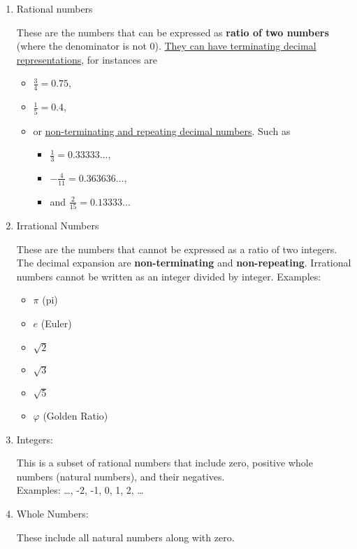 \documentclass{article}
\begin{document}
\begin{enumerate}

    \item Rational numbers \par 
    These are the numbers that can be expressed as
    \textbf{ratio of two numbers} (where the denominator is not 0).
    \underline{They can have terminating decimal representations},
    for instances are
    \begin{itemize}
        \item $\frac{3}{4} = 0.75$,
        \item $\frac{1}{5} = 0.4$,
        \item or \underline{non-terminating and repeating decimal numbers}.
        Such as
        \begin{itemize}
            \item $\frac{1}{3} = 0.33333\dots$,
            \item $- \frac{4}{11} = 0.363636\dots$,
            \item and $\frac{2}{15} = 0.13333\dots$
        \end{itemize}
    \end{itemize}

    \item Irrational Numbers \par
    These are the numbers that cannot be expressed as a ratio of two integers.
    The decimal expansion are \textbf{non-terminating} and \textbf{non-repeating}.
    Irrational numbers cannot be written as an integer divided by integer.
    Examples:
    \begin{itemize}
        \item $\pi$ (pi)
        \item $e$ (Euler)
        \item $\sqrt{2}$
        \item $\sqrt{3}$
        \item $\sqrt{5}$
        \item $\varphi$ (Golden Ratio)
    \end{itemize}

    \item Integers: \par
    This is a subset of rational numbers that include zero,
    positive whole numbers (natural numbers), and their negatives. \\
    Examples: \dots, -2, -1, 0, 1, 2, \dots

    \item Whole Numbers: \par
    These include all natural numbers along with zero.


\end{enumerate}
\end{document}
